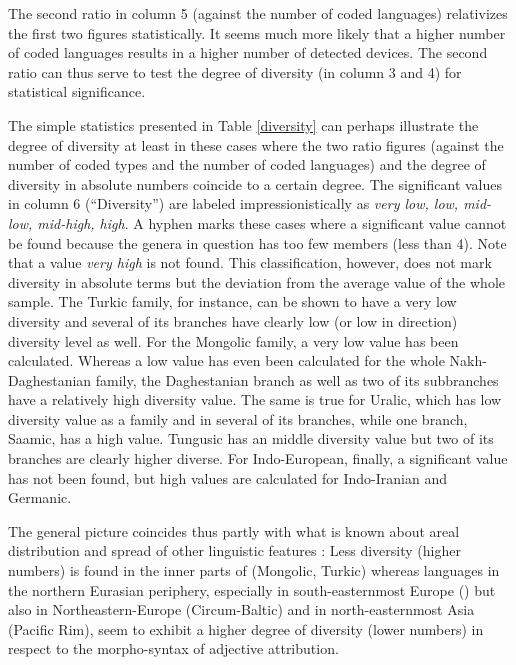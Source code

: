 The second ratio in column 5 (against the number of coded languages) relativizes the first two figures statistically. It seems much more likely that a higher number of coded languages results in a higher number of detected devices. The second ratio can thus serve to test the degree of diversity (in column 3 and 4) for statistical significance. 

The simple statistics presented in Table  \ref{diversity} can perhaps illustrate the degree of diversity at least in these cases where the two ratio figures (against the number of coded types and the number of coded languages) and the degree of diversity in absolute numbers coincide to a certain degree. The significant values in column 6 (“Diversity”) are labeled impressionistically as \textit{very low, low, mid-low, mid-high, high}. A hyphen marks these cases where a significant value cannot be found because the genera in question has too few members (less than 4). Note that a value \textit{very high} is not found. This classification, however, does not mark diversity in absolute terms but the deviation from the average value of the whole sample. The Turkic family, for instance,  can be shown to have a very low diversity and several of its branches have clearly low (or low in direction) diversity level as well. For the Mongolic family, a very low value has been calculated. Whereas a low value has even been calculated for the whole Nakh-Daghestanian family, the Daghestanian branch as well as two of its subbranches have a relatively high diversity value. The same is true for Uralic, which has low diversity value as a family and in several of its branches, while one branch, Saamic, has a high value. Tungusic has an middle diversity value but two of its branches are clearly higher diverse. For Indo-European, finally, a significant value has not been found, but high values are calculated for Indo-Iranian and Germanic.

The general picture coincides thus partly with what is known about areal distribution and spread of other linguistic features \citep[cf., e.g.,][]{nichols1992}: Less diversity (higher numbers) is found in the inner parts of  (Mongolic, Turkic) whereas languages in the northern Eurasian periphery, especially in south-easternmost Europe () but also in Northeastern-Europe (Circum-Baltic) and in north-easternmost Asia (Pacific Rim), seem to exhibit a higher degree of diversity (lower numbers) in respect to the morpho-syntax of adjective attribution.

